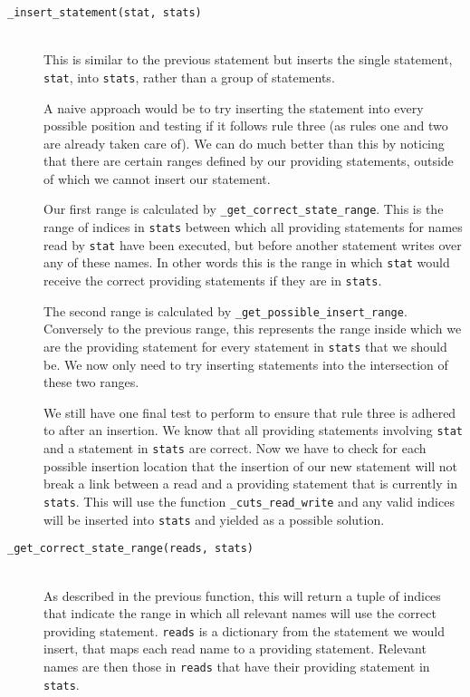 \documentclass{report}
\begin{document}
\begin{description}
\item[\texttt{\_insert\_statement(stat, stats)}] \hfill \\
This is similar to the previous statement but inserts the single statement, \texttt{stat}, into \texttt{stats}, rather than a group of statements.

A naive approach would be to try inserting the statement into every possible position and testing if it follows rule three (as rules one and two are
already taken care of). We can do much better than this by noticing that there are certain ranges defined by our providing statements, outside of
which we cannot insert our statement.

Our first range is calculated by \texttt{\_get\_correct\_state\_range}. This is the range of indices in \texttt{stats} between which all providing
statements for names read by \texttt{stat} have been executed, but before another statement writes over any of these names. In other words this is
the range in which \texttt{stat} would receive the correct providing statements if they are in \texttt{stats}.

The second range is  calculated by \texttt{\_get\_possible\_insert\_range}. Conversely to the previous range, this represents the range inside which
we are the providing statement for every statement in \texttt{stats} that we should be. We now only need to try inserting statements into the
intersection of these two ranges.

We still have one final test to perform to ensure that rule three is adhered to after an insertion. We know that all providing statements involving
\texttt{stat} and a statement in \texttt{stats} are correct. Now we have to check for each possible insertion location that the insertion of our
new statement will not break a link between a read and a providing statement that is currently in \texttt{stats}. This will use the function
\texttt{\_cuts\_read\_write} and any valid indices will be inserted into \texttt{stats} and yielded as a possible solution.

\item[\texttt{\_get\_correct\_state\_range(reads, stats)}] \hfill \\
As described in the previous function, this will return a tuple of indices that indicate the range in which all relevant names will use the correct
providing statement. \texttt{reads} is a dictionary from the statement we would insert, that maps each read name to a providing statement. Relevant
names are then those in \texttt{reads} that have their providing statement in \texttt{stats}.


\end{description}
\end{document}
